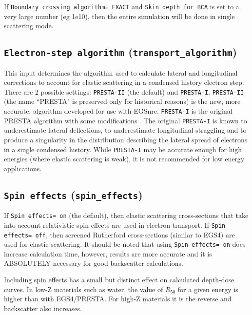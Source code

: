 \documentclass[12pt,twoside]{article}      %
\begin{document}
If {\tt Boundary crossing algorithm= EXACT} and
{\tt  Skin depth for BCA} is set to a very large number (eg 1e10),
then the entire simulation will be done in single scattering mode.


\subsection{{\tt Electron-step algorithm} ({\tt transport\_algorithm})}
\label{essect}

This input determines the algorithm used to calculate lateral and
longitudinal corrections to account for elastic scattering in a condensed
history electron step.  There
are 2 possible settings: {\tt PRESTA-II} (the default) and
{\tt PRESTA-I}.  {\tt PRESTA-II} (the name ``PRESTA" is preserved only
for historical reasons) is the new, more accurate, algorithm developed for
use with EGSnrc\cite{KR00}.  {\tt PRESTA-I} is the original
PRESTA algorithm with some modifications
\cite{BR87,Le50}.  The original {\tt PRESTA-I} is
known to underestimate lateral deflections, to underestimate longitudinal
straggling and to produce a singularity in the distribution describing
the lateral spread of electrons in a single condensed history.
While {\tt PRESTA-I} may be accurate enough for high energies
(where elastic scattering is weak), it is not recommended for low
energy applications.

\subsection{{\tt Spin effects} ({\tt spin\_effects})}

If {\tt Spin effects= on} (the default), then elastic scattering
cross-sections that take into account relativistic spin effects are used
in electron transport.  If {\tt Spin effects= off},  then
screened Rutherford cross-sections (similar to EGS4) are used for elastic
scattering.  It should be noted that using {\tt Spin effects= on} does
increase calculation time, however, results are more accurate and it
is ABSOLUTELY necessary for good backscatter calculations.

Including spin effects has a small but distinct effect on calculated
depth-dose curves.  In low-Z materials such as water, the value of
$R_{50}$ for a given energy is higher than with EGS4/PRESTA. For high-Z
materials it is the reverse and backscatter also increases.
\end{document}
